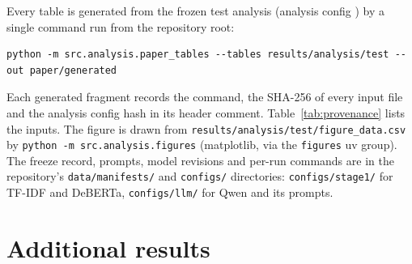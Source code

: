 \documentclass{article}
\begin{document}
Every table is generated from the frozen test analysis (analysis config \texttt{\AnalysisConfig})
by a single command run from the repository root:
{\footnotesize
\begin{verbatim}
python -m src.analysis.paper_tables --tables results/analysis/test --out paper/generated
\end{verbatim}
}
Each generated fragment records the command, the SHA-256 of every input file and the analysis
config hash in its header comment. Table~\ref{tab:provenance} lists the inputs. The figure is drawn
from \texttt{results/analysis/test/figure\_data.csv} by \texttt{python -m src.analysis.figures} (matplotlib, via the \texttt{figures} uv group).
The freeze record, prompts, model revisions and per-run commands are in the repository's
\texttt{data/manifests/} and \texttt{configs/} directories: \texttt{configs/stage1/} for TF-IDF and DeBERTa,
\texttt{configs/llm/} for Qwen and its prompts.

\begin{table}[h]
  \caption{Inputs behind each generated fragment.}
  \label{tab:provenance}
  \centering
  \footnotesize
  
\end{table}

\section{Additional results}
\label{app:extra}

\begin{table}[h]
  \caption{IndirectRequests transfer (LLM-generated data, no context, reported separately from
  the main test).}
  \label{tab:transfer}
  \centering
  \small
  
\end{table}
\end{document}
